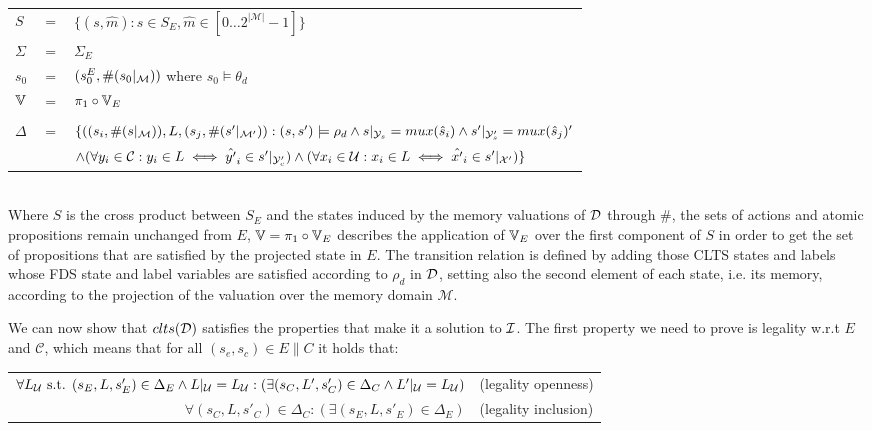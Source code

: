 \vspace{1em}
\begin{tabular}{ l c l }
	$S$ &$=$& $\{(s,\hat{m}) : s \in S_E, \hat{m} \in [0\ldots2^{|\mathcal{M}|}-1] \}$\\
	$\Sigma$ &$=$&$\Sigma_E$\\	
	$s_0$&$=$&$(s_0^{E}, \#(s_0|_{\mathcal{M}}))$ where $s_0 \models \theta_d$ \\
	$\mathbb{V}$&$=$&$\pi_1 \circ \mathbb{V}_E$\\
	&&\\
	$\Delta$&$=$&$\{((s_i,\#(s|_{\mathcal{M}})),L,(s_j,\#(s'|_{\mathcal{M}'})): (s, s') \models \rho_d \wedge  s|_{{\mathcal{Y}}_s} = mux(\hat{s}_{i})  \wedge s'|_{{\mathcal{Y}}'_s} = mux(\hat{s}_{j})'$ \\
	&&$\wedge (\forall y_i \in \mathcal{C} : y_i \in L \iff \hat{y'}_i \in s'|_{{\mathcal{Y}}'_c})  \wedge (\forall x_i \in \mathcal{U} : x_i \in L \iff \hat{x'}_i \in s'|_{{\mathcal{X}}'})  \}$\\
\end{tabular}
\vspace{1em}
\\
Where $S$ is the cross product between $S_E$ and the states induced by the memory valuations of $\mathcal{D}$ through $\#$, the sets of actions and atomic propositions remain unchanged from $E$, $\mathbb{V}=\pi_1 \circ \mathbb{V}_E$ describes the application of $\mathbb{V}_E$ over the first component of $S$ in order to get the set of propositions that are satisfied by the projected state in $E$. The transition relation is defined by adding those CLTS states and labels whose FDS state and label variables are satisfied according to $\rho_d$ in $\mathcal{D}$, setting also the second element of each state, i.e. its memory, according to the projection of the valuation over the memory domain $\mathcal{M}$.

We can now show that $clts(\mathcal{D})$ satisfies the properties that make it a solution to $\mathcal{I}$. The first property we need to prove is legality w.r.t $E$ and $\mathcal{C}$, which means that for all $(s_e,s_c) \in E \parallel C$ it holds that:\\

\begin{center}
\begin{tabular}{r l}

	$\forall L_{\mathcal{U}}\text{ s.t. }(s_E, L, s'_E) \in \Delta_E \wedge L|_{\mathcal{U}} = L_{\mathcal{U}}:( \exists (s_C, L', s'_C) \in \Delta_C \wedge L'|_{\mathcal{U}} = L_{\mathcal{U}})$ &(legality openness)\\
	$\forall (s_C, L, s'_C) \in \Delta_C: ( \exists (s_E, L, s'_E) \in \Delta_E)$& (legality inclusion)\\
\end{tabular}
\end{center}

